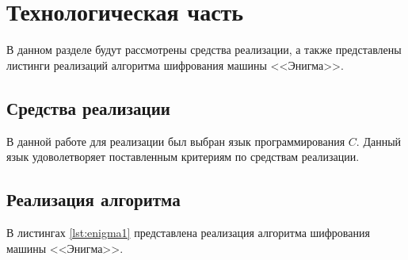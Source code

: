 \chapter{Технологическая часть}

В данном разделе будут рассмотрены средства реализации, а также представлены листинги реализаций алгоритма шифрования машины <<Энигма>>.

\section{Средства реализации}
В данной работе для реализации был выбран язык программирования $C$. Данный язык удоволетворяет поставленным критериям по средствам реализации.

\section{Реализация алгоритма}

В листингах \ref{lst:enigma1} представлена реализация алгоритма шифрования машины <<Энигма>>.

